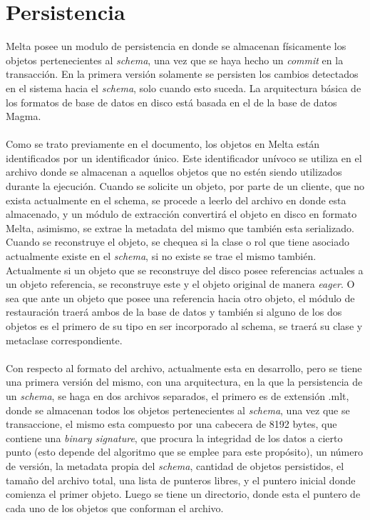 \documentclass{melta}
\begin{document}
\section{Persistencia}
\label{sec:persistencia}
Melta posee un modulo de persistencia en donde se almacenan físicamente los objetos pertenecientes al \textit{schema}, una vez que se haya hecho un \textit{commit} en la transacción. En la primera versión solamente se persisten los cambios detectados en el sistema hacia el \textit{schema}, solo cuando esto suceda. La arquitectura básica de los formatos de base de datos en disco está basada en el de la base de datos Magma. \cite{magma:gaylard}
\\\\
Como se trato previamente en el documento, los objetos en Melta están identificados por un identificador único. Este identificador unívoco se utiliza en el archivo donde se almacenan a aquellos objetos que no estén siendo utilizados durante la ejecución. Cuando se solicite un objeto, por parte de un cliente, que no exista actualmente en el schema, se procede a leerlo del archivo en donde esta almacenado, y un módulo de extracción convertirá el objeto en disco en formato Melta, asimismo, se extrae la metadata del mismo que también esta serializado. Cuando se reconstruye el objeto, se chequea si la clase o rol que tiene asociado actualmente existe en el \textit{schema}, si no existe se trae el mismo también. Actualmente si un objeto que se reconstruye del disco posee referencias actuales a un objeto referencia, se reconstruye este y el objeto original de manera \textit{eager}. O sea que ante un objeto que posee una referencia hacia otro objeto, el módulo de restauración traerá ambos de la base de datos y también si alguno de los dos objetos es el primero de su tipo en ser incorporado al schema, se traerá su clase y metaclase correspondiente.
\\\\
Con respecto al formato del archivo, actualmente esta en desarrollo, pero se tiene una primera versión del mismo, con una arquitectura, en la que la persistencia de un \textit{schema}, se haga en dos archivos separados, el primero es de extensión .mlt, donde se almacenan todos los objetos pertenecientes al \textit{schema}, una vez que se transaccione, el mismo esta compuesto por una cabecera de 8192 bytes, que contiene una \textit{binary signature}, que procura la integridad de los datos a cierto punto (esto depende del algoritmo que se emplee para este propósito), un número de versión, la metadata propia del \textit{schema}, cantidad de objetos persistidos, el tamaño del archivo total, una lista de punteros libres, y el puntero inicial donde comienza el primer objeto. Luego se tiene un directorio, donde esta el puntero de cada uno de los objetos que conforman el archivo. 
\end{document}

